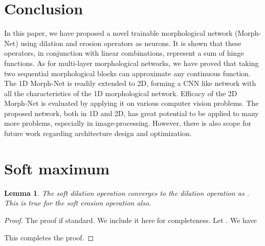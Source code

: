 \documentclass[12pt]{article}
\newtheorem{lemma}{Lemma}
\begin{document}
\section{Conclusion}
\label{sec:conclustion}  
In this paper, we have proposed a novel trainable morphological network (Morph-Net) using dilation and erosion operators as neurons. It is shown that these operators, in conjunction with linear combinations, represent a sum of hinge functions. As for multi-layer morphological networks, we have proved that taking two sequential morphological blocks can approximate any continuous function. The 1D Morph-Net is readily extended to 2D, forming a CNN like network with all the characteristics of the 1D morphological network. Efficacy of the 2D Morph-Net is evaluated by applying it on various computer vision problems. The proposed network, both in 1D and 2D, has great potential to be applied to many more problems, especially in image-processing. However, there is also scope for future work regarding architecture design and optimization. 


{
\small


}

\appendix


\section{Soft maximum}
\begin{lemma}
The soft dilation operation converges to the dilation operation as . This is true for the soft erosion operation also.
\end{lemma}
\begin{proof}
The proof if standard. We include it here for completeness. Let . We have

This completes the proof.
\end{proof}
\end{document}
